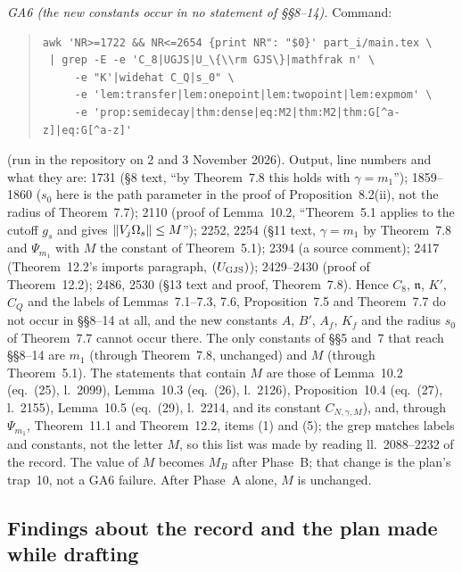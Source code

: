 \emph{GA6 (the new constants occur in no statement of \S\S8--14).}  Command:
\begin{quote}\footnotesize\begin{verbatim}
awk 'NR>=1722 && NR<=2654 {print NR": "$0}' part_i/main.tex \
 | grep -E -e 'C_8|UGJS|U_\{\\rm GJS\}|mathfrak n' \
     -e "K'|widehat C_Q|s_0" \
     -e 'lem:transfer|lem:onepoint|lem:twopoint|lem:expmom' \
     -e 'prop:semidecay|thm:dense|eq:M2|thm:M2|thm:G[^a-z]|eq:G[^a-z]'
\end{verbatim}\end{quote}
(run in the repository on 2 and 3 November 2026).  Output, line numbers and what they are: 1731
(\S8 text, ``by Theorem~7.8 this holds with $\gamma=m_1$''); 1859--1860 ($s_0$ here is the path
parameter in the proof of Proposition~8.2(ii), not the radius of Theorem~7.7); 2110 (proof of
Lemma~10.2, ``Theorem~5.1 applies to the cutoff $g_s$ and gives $\|V_j\Omega_s\|\le M$''); 2252, 2254
(\S11 text, $\gamma=m_1$ by Theorem~7.8 and $\Psi_{m_1}$ with $M$ the constant of Theorem~5.1); 2394
(a source comment); 2417 (Theorem~12.2's imports paragraph, $(U_{\rm GJS})$); 2429--2430 (proof of
Theorem~12.2); 2486, 2530 (\S13 text and proof, Theorem~7.8).  Hence $C_8$, $\mathfrak n$, $K'$,
$\widehat C_Q$ and the labels of Lemmas~7.1--7.3, 7.6, Proposition~7.5 and Theorem~7.7 do not occur
in \S\S8--14 at all, and the new constants $A$, $B'$, $A_f$, $K_f$ and the radius $s_0$ of
Theorem~7.7 cannot occur there.  The only constants of \S\S5 and~7 that reach \S\S8--14 are $m_1$
(through Theorem~7.8, unchanged) and $M$ (through Theorem~5.1).  The statements that contain $M$
are those of Lemma~10.2 (eq.~(25), l.~2099), Lemma~10.3 (eq.~(26), l.~2126), Proposition~10.4
(eq.~(27), l.~2155), Lemma~10.5 (eq.~(29), l.~2214, and its constant $C_{N,\gamma,M}$), and,
through $\Psi_{m_1}$, Theorem~11.1 and Theorem~12.2, items (1) and (5); the grep matches labels and
constants, not the letter $M$, so this list was made by reading ll.~2088--2232 of the record.  The
value of $M$ becomes $M_B$ after Phase~B; that change is the plan's trap~10, not a GA6 failure.
After Phase~A alone, $M$ is unchanged.

\subsection{Findings about the record and the plan made while drafting}\label{sub:cons-findings}

